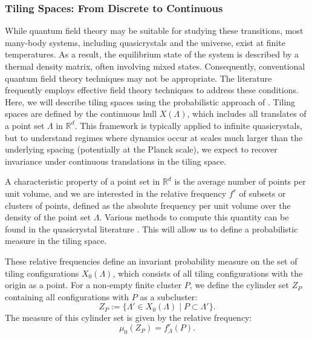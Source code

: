 \documentclass{article}
\begin{document}
\subsubsection{Tiling Spaces: From Discrete to Continuous}
While quantum field theory may be suitable for studying these transitions, most many-body systems, including quasicrystals and the universe, exist at finite temperatures. As a result, the equilibrium state of the system is described by a thermal density matrix, often involving mixed states. Consequently, conventional quantum field theory techniques may not be appropriate. The literature frequently employs effective field theory techniques to address these conditions. Here, we will describe tiling spaces using the probabilistic approach of \cite{BaakeGrimm}. Tiling spaces are defined by the continuous hull $X(\varLambda)$, which includes all translates of a point set $\varLambda$ in $\mathbb{R}^{d}$. This framework is typically applied to infinite quasicrystals, but to understand regimes where dynamics occur at scales much larger than the underlying spacing (potentially at the Planck scale), we expect to recover invariance under continuous translations in the tiling space.

A characteristic property of a point set in $\mathbb{R}^{d}$ is the average number of points per unit volume, and we are interested in the relative frequency $f^{r}$ of subsets or clusters of points, defined as the absolute frequency per unit volume over the density of the point set $\varLambda$. Various methods to compute this quantity can be found in the quasicrystal literature \cite{BaakeGrimm}. This will allow us to define a probabilistic measure in the tiling space.


These relative frequencies define an invariant probability measure on the set of tiling configurations $X_{0}(\varLambda)$, which consists of all tiling configurations with the origin as a point. For a non-empty finite cluster $P$, we define the cylinder set $Z_{P}$ containing all configurations with $P$ as a subcluster:
\begin{equation}
Z_{P}:=\{\varLambda'\in X_{0}(\varLambda)\mid P\subset\varLambda'\}.
\end{equation}
The measure of this cylinder set is given by the relative frequency:
\begin{equation}
\mu_{0}(Z_{P})=f_{\varLambda}^{r}(P).
\end{equation}
\end{document}
